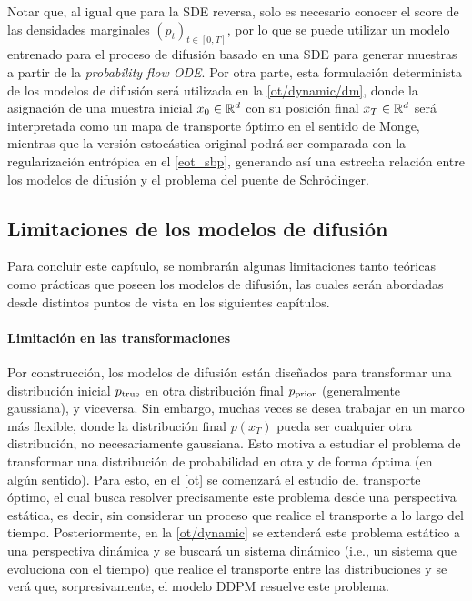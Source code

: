 Notar que, al igual que para la SDE reversa, solo es necesario conocer el score de las densidades marginales $(p_t)_{t\in[0,T]}$, por lo que se puede utilizar un modelo entrenado para el proceso de difusión basado en una SDE para generar muestras a partir de la \textit{probability flow ODE}. Por otra parte, esta formulación determinista de los modelos de difusión será utilizada en la \autoref{ot/dynamic/dm}, donde la asignación de una muestra inicial $x_0\in\mathbb{R}^d$ con su posición final $x_T\in\mathbb{R}^d$ será interpretada como un mapa de transporte óptimo en el sentido de Monge, mientras que la versión estocástica original podrá ser comparada con la regularización entrópica en el \autoref{eot_sbp}, generando así una estrecha relación entre los modelos de difusión y el problema del puente de Schrödinger.

\subsection{Limitaciones de los modelos de difusión}
\label{dm/continuous_dm/limitations}

Para concluir este capítulo, se nombrarán algunas limitaciones tanto teóricas como prácticas que poseen los modelos de difusión, las cuales serán abordadas desde distintos puntos de vista en los siguientes capítulos.

\paragraph{Limitación en las transformaciones}

Por construcción, los modelos de difusión están diseñados para transformar una distribución inicial $p_{\operatorname{true}}$ en otra distribución final $p_{\operatorname{prior}}$ (generalmente gaussiana), y viceversa. Sin embargo, muchas veces se desea trabajar en un marco más flexible, donde la distribución final $p(x_T)$ pueda ser cualquier otra distribución, no necesariamente gaussiana. Esto motiva a estudiar el problema de transformar una distribución de probabilidad en otra y de forma óptima (en algún sentido). Para esto, en el \autoref{ot} se comenzará el estudio del transporte óptimo, el cual busca resolver precisamente este problema desde una perspectiva estática, es decir, sin considerar un proceso que realice el transporte a lo largo del tiempo. Posteriormente, en la \autoref{ot/dynamic} se extenderá este problema estático a una perspectiva dinámica y se buscará un sistema dinámico (i.e., un sistema que evoluciona con el tiempo) que realice el transporte entre las distribuciones y se verá que, sorpresivamente, el modelo DDPM resuelve este problema.

